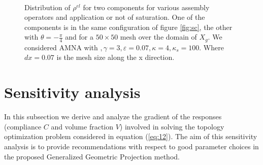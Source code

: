 \begin{figure}[!ht]
    \quad
    \\
    \quad
    \caption{Distribution of $ \rho^{el}$  for two components for various assembly operators and application or not of saturation. One of the components is in the same configuration of figure \ref{fig:sc}, the other with $\theta=-\frac{\pi}{4}$ and for a $50\times50$ mesh over the domain of $X_g$. We considered AMNA with $, \gamma=3, \varepsilon=0.07, \kappa=4, \kappa_s=100$. Where $dx=0.07$ is the mesh size along the x direction.\label{fig:asbly}}%
\end{figure}
\clearpage
\section{Sensitivity analysis}
\label{SA}
In this subsection we derive and analyze the gradient of the responses (compliance $C$ and volume fraction $V$) involved in solving the topology optimization problem considered in equation (\ref{eq:12}). The aim of this sensitivity analysis is to provide recommendations with respect to good parameter choices in the proposed Generalized Geometric Projection method. 

